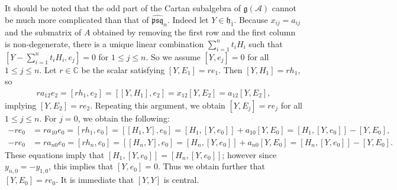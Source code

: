 \documentclass[12pt, a4paper, reqno]{amsart}
\def\ol{\overline}
\theoremstyle{definition}
\theoremstyle{definition}
\theoremstyle{definition}
\numberwithin{theorem}{section}
\numberwithin{lemma}{section}
\numberwithin{remark}{section}
\numberwithin{definition}{section}
\numberwithin{corollary}{section}
\numberwithin{proposition}{section}
\numberwithin{example}{section}
\begin{document}
	It should be noted that the odd part of the Cartan subalgebra of \(\mathfrak{g}(\mathcal{A})\) cannot be much more complicated than that of \(\hat{\mathfrak{psq}}_n\). Indeed let \(Y \in \mathfrak{h}_{\ol{1}}\). Because \(x_{ij} = a_{ij}\) and the submatrix of \(A\) obtained by removing the first row and the first column is non-degenerate, there is a unique linear combination \(\sum_{i=1}^n t_i H_i\) such that \([Y-\sum_{i=1}^n t_i H_i,e_j] = 0\) for \(1\leq j \leq n\). So we assume \([Y,e_j] = 0\) for all \(1\leq j \leq n\). Let \(r \in \mathbb{C}\) be the scalar satisfying \([Y,E_1] = re_1\). Then \([Y,H_1] = rh_1\), so
	\begin{align*}
		ra_{12}e_2 = [rh_1, e_2] = [[Y,H_1],e_2] = x_{12}[Y,E_2] = a_{12}[Y,E_2],
	\end{align*}
	implying \([Y,E_2]=re_2\). Repeating this argument, we obtain \([Y,E_j] = re_j\) for all \(1\leq j \leq n\). For \(j=0\), we obtain the following:
	\begin{align*}
		-re_0 &= ra_{10}e_0 = [rh_1, e_0] = [[H_1,Y], e_0] = [H_1,[Y,e_0]] + a_{10}[Y,E_0] = [H_1,[Y,e_0]] - [Y,E_0],\\
		-re_0 & = ra_{n0}e_0 = [rh_n, e_0] = [[H_n,Y], e_0] = [H_n,[Y,e_0]] + a_{n0}[Y,E_0] = [H_n,[Y,e_0]] - [Y,E_0].
	\end{align*}
	These equations imply that $[H_1,[Y,e_0]]=[H_n,[Y,e_0]]$; however since $y_{n,0}=-y_{1,0}$, this implies that $[Y,e_0]=0$.  Thus we obtain further that \([Y,E_0] = re_0\). It is immediate that \([Y,Y]\) is central. 
	
	
\end{document}
